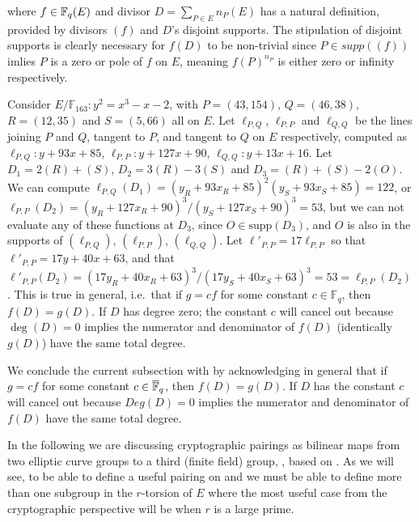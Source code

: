where $f \in \mathbb{F}_q(E)$ and divisor $D = \sum_{P \in E} n_P (E)$ has a natural definition, provided by divisors $(f)$ and $D$'s disjoint supports. The stipulation of disjoint supports is clearly necessary for $f(D)$ to be non-trivial since $P \in supp((f))$ imlies $P$ is a zero or pole of $f$ on $E$, meaning $f(P)^{n_P}$  is either zero or infinity respectively.



\begin{example}
Consider $E/\mathbb{F}_{163} : y^2 = x^3 - x - 2$, with $P = (43, 154)$, $Q = (46, 38)$, $R = (12, 35)$ and $S = (5, 66)$ all on $E$. Let $\ell_{P,Q}$, $\ell_{P,P}$ and $\ell_{Q,Q}$ be the lines joining $P$ and $Q$, tangent to $P$, and tangent to $Q$ on $E$ respectively, computed as $\ell_{P,Q} : y + 93x + 85$, $\ell_{P,P} : y + 127x + 90$, $\ell_{Q,Q} : y + 13x + 16$. Let $D_1 = 2(R) + (S)$, $D_2 = 3(R) - 3(S)$ and $D_3 = (R) + (S) - 2(O)$. We can compute $\ell_{P,Q}(D_1) = (y_R + 93x_R + 85)^2(y_S + 93x_S + 85) = 122$, or $\ell_{P,P}(D_2) = (y_R + 127x_R + 90)^3/(y_S + 127x_S + 90)^3 = 53$, but we can not evaluate any of these functions at $D_3$, since $O \in \text{supp}(D_3)$, and $O$ is also in the supports of $(\ell_{P,Q})$, $(\ell_{P,P})$, $(\ell_{Q,Q})$. Let $\ell'_{P,P} = 17\ell_{P,P}$ so that $\ell'_{P,P} = 17y + 40x + 63$, and that $\ell'_{P,P}(D_2) = (17y_R + 40x_R + 63)^3/(17y_S + 40x_S + 63)^3 = 53 = \ell_{P,P}(D_2)$. This is true in general, i.e.\ that if $g = cf$ for some constant $c \in \mathbb{F}_q$, then $f(D) = g(D)$. If $D$ has degree zero; the constant $c$ will cancel out because $\deg(D) = 0$ implies the numerator and denominator of $f(D)$ (identically $g(D)$) have the same total degree.
\label{example:324}	
\end{example}

We conclude the current subsection with  by acknowledging in general  that if $g = cf$ for some constant $c \in \overline{\mathbb{F}}_{q}$, then $f(D) = g(D)$. If $D$ has the constant $c$ will cancel out because $Deg(D) = 0$ implies the numerator and denominator of $f(D)$ have the same total degree.


In the following  we are discussing cryptographic pairings as bilinear maps from two elliptic curve groups to a third (finite field) group,  , based on \cite{theory.pairings.for.beginners, menezes2004ECC,Menezes1993}.  As we will see, to be able to define a useful pairing on  and  we must be able to define more than one subgroup in the $r$-torsion of $E$ where the most useful case from the  cryptographic perspective will be when $r$ is a large prime. 
